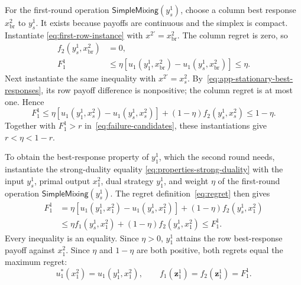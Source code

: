 \documentclass[11pt]{article}
\theoremstyle{remark}
\theoremstyle{plain}
\newcommand{\sm}{\mathsf{SimpleMixing}}
\begin{document}
For the first-round operation $\sm(y_s^1)$, choose a column best
response $x_{\mathrm{br}}^2$ to $y_s^1$. It exists because payoffs are
continuous and the simplex is compact. Instantiate
\eqref{eq:first-row-instance} with $x^{2\prime}=x_{\mathrm{br}}^2$.
The column regret is zero, so
\begin{equation}
 \begin{aligned}
 f_2(y_s^1,x_{\mathrm{br}}^2)&=0,\\
 F_1^1&\le\eta[u_1(y_1^1,x_{\mathrm{br}}^2)
                   -u_1(y_s^1,x_{\mathrm{br}}^2)]\le\eta.
 \end{aligned}
 \label{eq:app-first-row-best-response-test}
\end{equation}
Next instantiate the same inequality with $x^{2\prime}=x_s^2$.
By~\eqref{eq:app-stationary-best-responses}, its row payoff
difference is nonpositive; the column regret is at most one. Hence
\begin{equation}
 F_1^1\le\eta[u_1(y_1^1,x_s^2)-u_1(y_s^1,x_s^2)]
                  +(1-\eta)f_2(y_s^1,x_s^2)\le1-\eta.
 \label{eq:app-first-row-stationary-test}
\end{equation}
Together with $F_1^1>r$ in~\eqref{eq:failure-candidates}, these
instantiations give
$r<\eta<1-r$.

To obtain the best-response property of $y_1^1$, which the second
round needs, instantiate the strong-duality equality
\eqref{eq:properties-strong-duality} with the input $y_s^1$,
primal output $x_1^2$, dual strategy $y_1^1$, and weight $\eta$
of the first-round operation $\sm(y_s^1)$.
The regret definition~\eqref{eq:regret} then gives
\begin{equation}
 \begin{aligned}
 F_1^1
 &=\eta[u_1(y_1^1,x_1^2)-u_1(y_s^1,x_1^2)]
                       +(1-\eta)f_2(y_s^1,x_1^2)\\
 &\le\eta f_1(y_s^1,x_1^2)+(1-\eta)f_2(y_s^1,x_1^2)
 \le F_1^1.
 \end{aligned}
 \label{eq:app-first-row-tightness}
\end{equation}
Every inequality is an equality. Since $\eta>0$, $y_1^1$ attains
the row best-response payoff against $x_1^2$. Since $\eta$ and
$1-\eta$ are both positive, both regrets equal the maximum regret:
\begin{equation}
 u_1^*(x_1^2)=u_1(y_1^1,x_1^2),\qquad
 f_1(\boldsymbol z_1^1)=f_2(\boldsymbol z_1^1)=F_1^1.
 \label{eq:app-first-row-best-response-output}
\end{equation}
\end{document}
